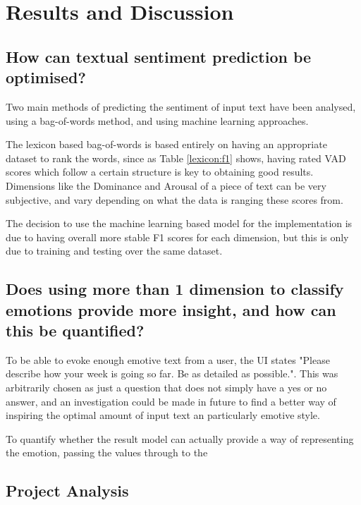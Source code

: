 \section{Results and Discussion}


\subsection{How can textual sentiment prediction be optimised?}

Two main methods of predicting the sentiment of input text have been analysed, using a bag-of-words method, and using machine learning approaches.

The lexicon based bag-of-words is based entirely on having an appropriate dataset to rank the words, since as Table \ref{lexicon:f1} shows, having rated VAD scores which follow a certain structure is key to obtaining good results. Dimensions like the Dominance and Arousal of a piece of text can be very subjective, and vary depending on what the data is ranging these scores from. 

The decision to use the machine learning based model for the implementation is due to having overall more stable F1 scores for each dimension, but this is only due to training and testing over the same dataset. 


    


\subsection{Does using more than 1 dimension to classify emotions provide more insight, and how can this be quantified?}

To be able to evoke enough emotive text from a user, the UI states "Please describe how your week is going so far. Be as detailed as possible.". This was arbitrarily chosen as just a question that does not simply have a yes or no answer, and an investigation could be made in future to find a better way of inspiring the optimal amount of input text an particularly emotive style.

To quantify whether the result model can actually provide a way of representing the emotion, passing the values through to the 


\subsection{Project Analysis}


